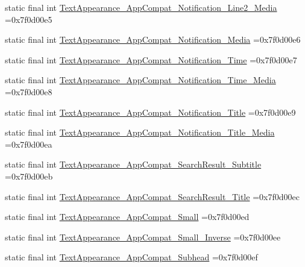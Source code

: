 \begin{DoxyCompactItemize}
static final int \mbox{\hyperlink{classbr_1_1unb_1_1cic_1_1mp_1_1marketmaster_1_1R_1_1style_a257864cfc67928b49e7468a11647b611}{Text\+Appearance\+\_\+\+App\+Compat\+\_\+\+Notification\+\_\+\+Line2\+\_\+\+Media}} =0x7f0d00e5
\item 
static final int \mbox{\hyperlink{classbr_1_1unb_1_1cic_1_1mp_1_1marketmaster_1_1R_1_1style_aaf9f8370775c038bf10b056f8018e0ef}{Text\+Appearance\+\_\+\+App\+Compat\+\_\+\+Notification\+\_\+\+Media}} =0x7f0d00e6
\item 
static final int \mbox{\hyperlink{classbr_1_1unb_1_1cic_1_1mp_1_1marketmaster_1_1R_1_1style_ab68add8034e4eb7953e1f1e201efe4f7}{Text\+Appearance\+\_\+\+App\+Compat\+\_\+\+Notification\+\_\+\+Time}} =0x7f0d00e7
\item 
static final int \mbox{\hyperlink{classbr_1_1unb_1_1cic_1_1mp_1_1marketmaster_1_1R_1_1style_ade20759068b9a466541d9d4437b46646}{Text\+Appearance\+\_\+\+App\+Compat\+\_\+\+Notification\+\_\+\+Time\+\_\+\+Media}} =0x7f0d00e8
\item 
static final int \mbox{\hyperlink{classbr_1_1unb_1_1cic_1_1mp_1_1marketmaster_1_1R_1_1style_aaec720ab5e2482c230d6eced7278a57a}{Text\+Appearance\+\_\+\+App\+Compat\+\_\+\+Notification\+\_\+\+Title}} =0x7f0d00e9
\item 
static final int \mbox{\hyperlink{classbr_1_1unb_1_1cic_1_1mp_1_1marketmaster_1_1R_1_1style_a8f7cbf6fb2ce57afba5d8c459fe924ae}{Text\+Appearance\+\_\+\+App\+Compat\+\_\+\+Notification\+\_\+\+Title\+\_\+\+Media}} =0x7f0d00ea
\item 
static final int \mbox{\hyperlink{classbr_1_1unb_1_1cic_1_1mp_1_1marketmaster_1_1R_1_1style_a4f08091074ec33b7e005b17ce73157ed}{Text\+Appearance\+\_\+\+App\+Compat\+\_\+\+Search\+Result\+\_\+\+Subtitle}} =0x7f0d00eb
\item 
static final int \mbox{\hyperlink{classbr_1_1unb_1_1cic_1_1mp_1_1marketmaster_1_1R_1_1style_a7356484f835d09591342d7865b3a0f1d}{Text\+Appearance\+\_\+\+App\+Compat\+\_\+\+Search\+Result\+\_\+\+Title}} =0x7f0d00ec
\item 
static final int \mbox{\hyperlink{classbr_1_1unb_1_1cic_1_1mp_1_1marketmaster_1_1R_1_1style_a77c056c4ab8a020404e914b290402cd1}{Text\+Appearance\+\_\+\+App\+Compat\+\_\+\+Small}} =0x7f0d00ed
\item 
static final int \mbox{\hyperlink{classbr_1_1unb_1_1cic_1_1mp_1_1marketmaster_1_1R_1_1style_ae445d60bca295f1b27bdd1e15a1a0c5e}{Text\+Appearance\+\_\+\+App\+Compat\+\_\+\+Small\+\_\+\+Inverse}} =0x7f0d00ee
\item 
static final int \mbox{\hyperlink{classbr_1_1unb_1_1cic_1_1mp_1_1marketmaster_1_1R_1_1style_a8589ce6934681d2237807c8674994c1d}{Text\+Appearance\+\_\+\+App\+Compat\+\_\+\+Subhead}} =0x7f0d00ef

\end{DoxyCompactItemize}
